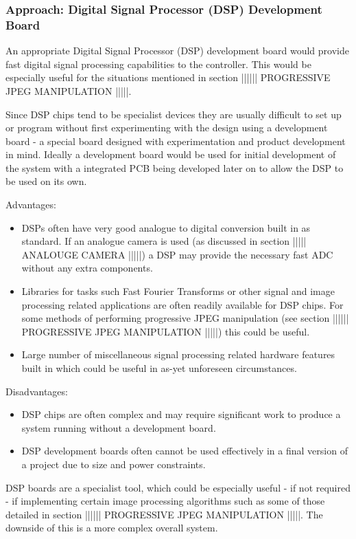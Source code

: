 \subsubsection{Approach: Digital Signal Processor (DSP) Development Board}
An appropriate Digital Signal Processor (DSP) development board would provide fast digital signal processing capabilities to the controller. This would be especially useful for the situations mentioned in section |||||| PROGRESSIVE JPEG MANIPULATION |||||.

Since DSP chips tend to be specialist devices they are usually difficult to set up or program without first experimenting with the design using a development board - a special board designed with experimentation and product development in mind. Ideally a development board would be used for initial development of the system with a integrated PCB being developed later on to allow the DSP to be used on its own.

Advantages:
\begin{itemize}
\item DSPs often have very good analogue to digital conversion built in as standard. If an analogue camera is used (as discussed in section ||||| ANALOUGE CAMERA |||||) a DSP may provide the necessary fast ADC without any extra components.

\item Libraries for tasks such Fast Fourier Transforms or other signal and image processing related applications are often readily available for DSP chips. For some methods of performing progressive JPEG manipulation (see section |||||| PROGRESSIVE JPEG MANIPULATION |||||) this could be useful.

\item Large number of miscellaneous signal processing related hardware features built in which could be useful in as-yet unforeseen circumstances.
\end{itemize}

Disadvantages:
\begin{itemize}
\item DSP chips are often complex and may require significant work to produce a system running without a development board.

\item DSP development boards often cannot be used effectively in a final version of a project due to size and power constraints.
\end{itemize}


DSP boards are a specialist tool, which could be especially useful - if not required - if implementing certain image processing algorithms such as some of those detailed in section |||||| PROGRESSIVE JPEG MANIPULATION |||||. The downside of this is a more complex overall system.


